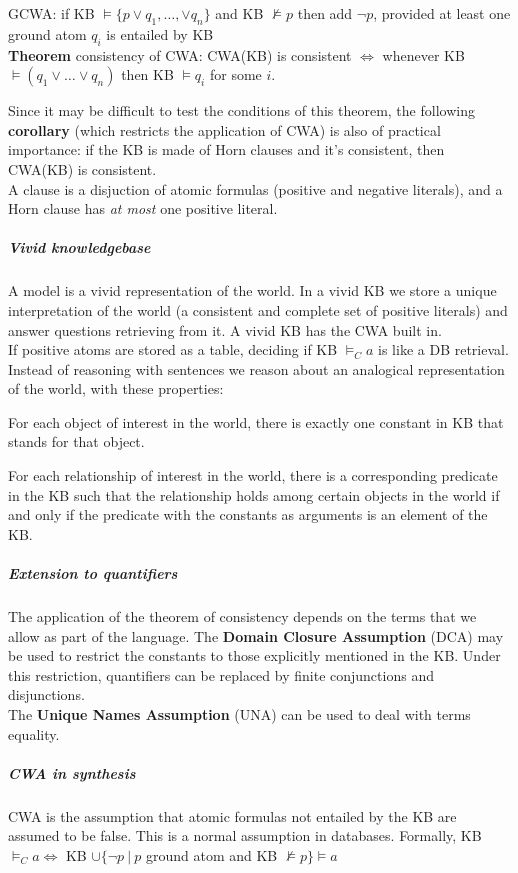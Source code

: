 \documentclass[10pt]{report}
\begin{document}
\begin{list}{}{}
	\item GCWA: if KB $\vDash\{p\vee q_1,\ldots,\vee q_n\}$ and KB $\not\vDash p$ then add $\neg p$, provided at least one ground atom $q_i$ is entailed by KB\\
	\textbf{Theorem} consistency of CWA: CWA(KB) is consistent $\Leftrightarrow$ whenever KB $\vDash(q_1\vee\ldots\vee q_n)$ then KB $\vDash q_i$ for some $i$.
\end{list}
Since it may be difficult to test the conditions of this theorem, the following \textbf{corollary} (which restricts the application of CWA) is also of practical importance: if the KB is made of Horn clauses and it's consistent, then CWA(KB) is consistent.\\
A clause is a disjuction of atomic formulas (positive and negative literals), and a Horn clause has \textit{at most} one positive literal.
\subparagraph{Vivid knowledgebase} A model is a vivid representation of the world. In a vivid KB we store a unique interpretation of the world (a consistent and complete set of positive literals) and answer questions retrieving from it. A vivid KB has the CWA built in.\\
If positive atoms are stored as a table, deciding if KB $\vDash_C a$ is like a DB retrieval. Instead of reasoning with sentences we reason about an analogical representation of the world, with these properties:
\begin{list}{}{}
	\item For each object of interest in the world, there is exactly one constant in KB that stands for that object.
	\item For each relationship of interest in the world, there is a corresponding predicate in the KB such that the relationship holds among certain objects in the world if and only if the predicate with the constants as arguments is an element of the KB.
\end{list}
\subparagraph{Extension to quantifiers} The application of the theorem of consistency depends on the terms that we allow as part of the language. The \textbf{Domain Closure Assumption} (DCA) may be used to restrict the constants to those explicitly mentioned in the KB. Under this restriction, quantifiers can be replaced by finite conjunctions and disjunctions.\\
The \textbf{Unique Names Assumption} (UNA) can be used to deal with terms equality.
\subparagraph{CWA in synthesis} CWA is the assumption that atomic formulas not entailed by the KB are assumed to be false. This is a normal assumption in databases. Formally, KB $\vDash_C a \Leftrightarrow$ KB $\cup\{\neg p\:|\:p$ ground atom and KB $\not\vDash p\}\vDash a$\\
\end{document}
